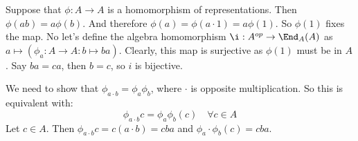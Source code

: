 
Suppose that $\phi: A \to A$ is a homomorphism of representations. Then $\phi(ab)=a\phi(b)$.
And therefore $\phi(a)=\phi(a\cdot 1)=a\phi(1)$. So $\phi(1)$ fixes the map. No let's define the algebra homomorphism $\i : A^{op} \to \End_A(A) $ as $a \mapsto (\phi_a: A\to A: b \mapsto ba)$. Clearly, this map is surjective as $\phi(1)$ must be in $A$. Say $ba = ca$, then $b=c$, so $i$ is bijective.

We need to show that  $\phi_{a\cdot b}=\phi_a \phi_b$, where $\cdot$ is opposite multiplication. So this is equivalent with:
\[\phi_{a\cdot b}c = \phi_a \phi_b(c) \quad \forall c \in A \]
Let $c\in A$. Then $\phi_{a\cdot b}c = c(a\cdot b)=cba$ and $\phi_a \cdot \phi_b (c)= cba$.
